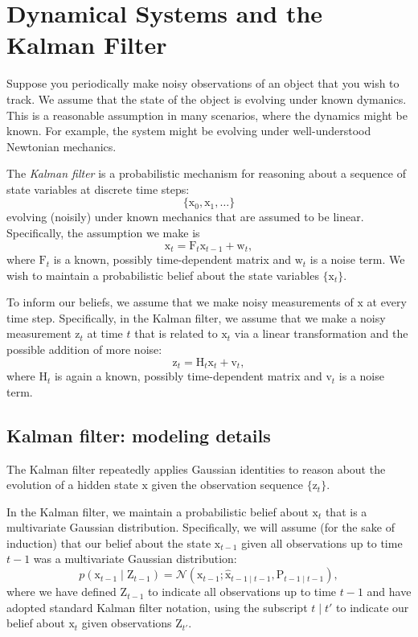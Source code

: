 \documentclass{article}
\newcommand{\given}{\mid}
\newcommand{\mc}[1]{\mathcal{#1}}
\newcommand{\mat}[1]{\bm{\mathrm{#1}}}
\renewcommand{\vec}[1]{\bm{\mathrm{#1}}}
\begin{document}
\section*{Dynamical Systems and the Kalman Filter}

Suppose you periodically make noisy observations of an object that you
wish to track.  We assume that the state of the object is evolving
under known dymanics.  This is a reasonable assumption in many
scenarios, where the dynamics might be known.  For example, the system
might be evolving under well-understood Newtonian mechanics.

The \emph{Kalman filter} is a probabilistic mechanism for reasoning
about a sequence of state variables at discrete time steps:
\[
  \{\vec{x}_0, \vec{x}_1, \dotsc \}
\]
evolving (noisily) under known mechanics that are assumed to be
linear.  Specifically, the assumption we make is
\[
  \vec{x}_t = \mat{F}_t \vec{x}_{t - 1} + \vec{w}_t,
\]
where $\mat{F}_t$ is a known, possibly time-dependent matrix and
$\vec{w}_t$ is a noise term.  We wish to maintain a probabilistic
belief about the state variables $\{\vec{x}_t\}$.

To inform our beliefs, we assume that we make noisy measurements of
$\vec{x}$ at every time step.  Specifically, in the Kalman filter, we
assume that we make a noisy measurement $\vec{z}_t$ at time $t$ that
is related to $\vec{x}_t$ via a linear transformation and the possible
addition of more noise:
\[
  \vec{z}_t = \mat{H}_t \vec{x}_t + \vec{v}_t,
\]
where $\mat{H}_t$ is again a known, possibly time-dependent matrix
and $\vec{v}_t$ is a noise term.

\subsection*{Kalman filter: modeling details}

The Kalman filter repeatedly applies Gaussian identities to
reason about the evolution of a hidden state $\vec{x}$ given
the observation sequence $\{ \vec{z}_t \}$.

In the Kalman filter, we maintain a probabilistic belief about
$\vec{x}_t$ that is a multivariate Gaussian distribution.
Specifically, we will assume (for the sake of induction) that our
belief about the state $\vec{x}_{t - 1}$ given all observations
up to time $t - 1$ was a multivariate Gaussian distribution:
\[
  p(\vec{x}_{t - 1} \given \mat{Z}_{t - 1})
  =
  \mc{N}(\vec{x}_{t - 1};
  \hat{\vec{x}}_{t - 1 \given t - 1},
  \mat{P}_{t - 1 \given t - 1}
  ),
\]
where we have defined $\mat{Z}_{t - 1}$ to indicate all observations
up to time $t - 1$ and have adopted standard Kalman filter notation,
using the subscript $t \given t'$ to indicate our belief about
$\vec{x}_t$ given observations $\mat{Z}_{t'}$.
\end{document}
